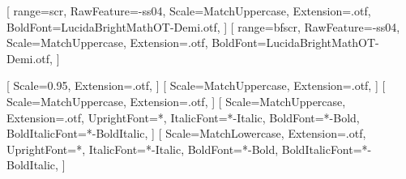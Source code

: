 %
%
[%
  range={scr},%
  RawFeature={-ss04},
  Scale=MatchUppercase,
  Extension=.otf,
  BoldFont=LucidaBrightMathOT-Demi.otf,%
]
[%
  range={bfscr},%
  RawFeature={-ss04},
  Scale=MatchUppercase,
  Extension=.otf,
  BoldFont=LucidaBrightMathOT-Demi.otf,
]
\setoperatorfont\normalfont
%

\newfontface{}[%
  Scale=0.95,%
  Extension=.otf,
]
\newfontface{}[%
  Scale=MatchUppercase,
  Extension=.otf,
]
\newfontface{}[%
  Scale=MatchUppercase,
  Extension=.otf,
]
\newfontface{}[%
  Scale=MatchUppercase,
  Extension=.otf,
  UprightFont=*,
  ItalicFont=*-Italic,
  BoldFont=*-Bold,
  BoldItalicFont=*-BoldItalic,
]
\newfontface{}[%
  Scale=MatchLowercase,%
  Extension=.otf,
  UprightFont=*,
  ItalicFont=*-Italic,
  BoldFont=*-Bold,
  BoldItalicFont=*-BoldItalic,
]
\fi
